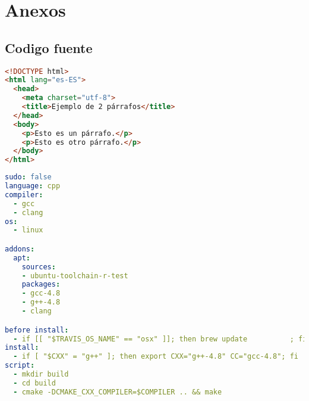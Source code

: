 \chapter{Anexos}

\section{Codigo fuente}

\begin{lstlisting}[language=html]
<!DOCTYPE html>
<html lang="es-ES">
  <head>
    <meta charset="utf-8">
    <title>Ejemplo de 2 párrafos</title>
  </head>
  <body>
    <p>Esto es un párrafo.</p>
    <p>Esto es otro párrafo.</p>
  </body>
</html>
\end{lstlisting}

\begin{lstlisting}[language=yml]
sudo: false
language: cpp
compiler:
  - gcc
  - clang
os:
  - linux

addons:
  apt:
    sources:
    - ubuntu-toolchain-r-test
    packages:
    - gcc-4.8
    - g++-4.8
    - clang

before install:
  - if [[ "$TRAVIS_OS_NAME" == "osx" ]]; then brew update          ; fi
install:
  - if [ "$CXX" = "g++" ]; then export CXX="g++-4.8" CC="gcc-4.8"; fi
script:
  - mkdir build
  - cd build
  - cmake -DCMAKE_CXX_COMPILER=$COMPILER .. && make
\end{lstlisting}